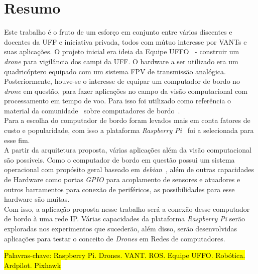 \documentclass[12pt,a4paper,oneside]{book}
\begin{document}
\pagebreak




\chapter*{Resumo}
%
%
\thispagestyle{myheadings}
%
Este trabalho é o fruto de um esforço em conjunto entre vários discentes e docentes da UFF e iniciativa privada, todos com mútuo 
interesse por VANTs e suas aplicações. O projeto inicial era ideia da Equipe UFFO~\cite{url:equipeuffo} - construir um \textit{drone} 
para vigilância dos campi da UFF. O hardware a ser utilizado era um quadricóptero equipado com um sistema FPV de transmissão analógica. 
Posteriormente, houve-se o interesse de equipar um computador de bordo no \textit{drone} em questão, para fazer aplicações no campo 
da visão computacional com processamento em tempo de voo. Para isso foi utilizado como referência o material da comunidade~\cite{url:ardupilotdoc} 
sobre computadores de bordo~\cite{url:ardupilot-companioncomputers}.\\
%
Para a escolha do computador de bordo foram levados mais em conta fatores de custo e popularidade, com isso a plataforma 
\textit{Raspberry Pi}~\cite{url:raspberrypi} foi a selecionada para esse fim.\\
%
A partir da arquitetura proposta, várias aplicações além da visão computacional são possíveis. Como o computador de bordo em questão 
possui um sistema operacional com propósito geral baseado em \textit{debian}~\cite{url:debian}, além de outras capacidades de Hardware como portas 
\textit{GPIO} para acoplamento de sensores e atuadores e outros barramentos para conexão de periféricos, as possibilidades para esse hardware são muitas.\\
%
Com isso, a aplicação proposta nesse trabalho será a conexão desse computador de bordo à uma rede IP. Várias capacidades da plataforma 
\textit{Raspberry Pi} serão exploradas nos experimentos que sucederão, além disso, serão desenvolvidas aplicações para testar o conceito de 
\textit{Drones} em Redes de computadores.
%

\bigskip

\hl{ Palavras-chave: Raspberry Pi. Drones. VANT. ROS. Equipe UFFO. Robótica. Ardpilot. Pixhawk}
\end{document}
